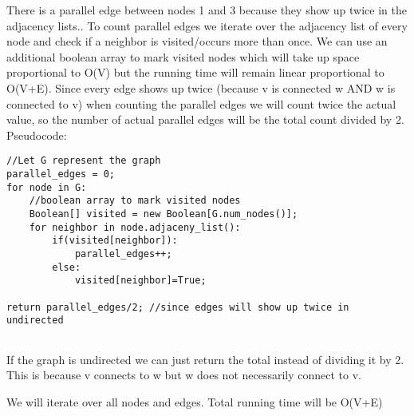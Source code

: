 \documentclass[11pt,fleqn]{article}
\begin{document}
\begin{enumerate}
There is a parallel edge between nodes 1 and 3 because they show up twice in the adjacency lists.. To count parallel edges we iterate over the adjacency list of every node and check if a neighbor is visited/occurs more than once. We can use an additional boolean array to mark visited nodes which will take up space proportional to O(V) but the running time will remain linear proportional to O(V+E). Since every edge shows up twice (because v is connected w AND w is connected to v) when counting the parallel edges we will count twice the actual value, so the number of actual parallel edges will be the total count divided by 2. Pseudocode:

\begin{verbatim}
//Let G represent the graph
parallel_edges = 0;
for node in G:	
    //boolean array to mark visited nodes
    Boolean[] visited = new Boolean[G.num_nodes()]; 
    for neighbor in node.adjaceny_list():
        if(visited[neighbor]):
            parallel_edges++;
        else:
            visited[neighbor]=True;

return parallel_edges/2; //since edges will show up twice in undirected
	
\end{verbatim}

If the graph is undirected we can just return the total instead of dividing it by 2. This is because v connects to w but w does not necessarily connect to v.

We will iterate over all nodes and edges. Total running time will be O(V+E)\\


\end{enumerate}
\end{document}
